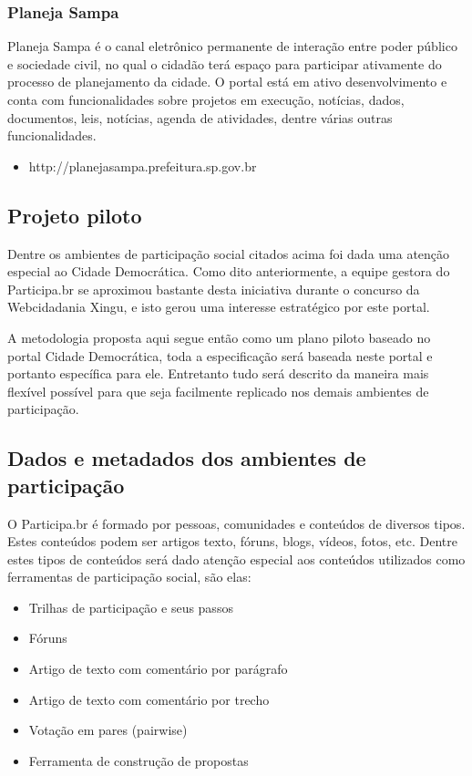 \documentclass[12pt]{article}
\begin{document}
\subsubsection{Planeja Sampa}

Planeja Sampa é o canal eletrônico permanente de interação entre poder público
e sociedade civil, no qual o cidadão terá espaço para participar ativamente do
processo de planejamento da cidade. O portal está em ativo desenvolvimento e
conta com funcionalidades sobre projetos em execução, notícias, dados,
documentos, leis, notícias, agenda de atividades, dentre várias outras
funcionalidades.

\begin{itemize}
  \item http://planejasampa.prefeitura.sp.gov.br
\end{itemize}

\subsection{Projeto piloto}

Dentre os ambientes de participação social citados acima foi dada uma atenção
especial ao Cidade Democrática. Como dito anteriormente, a equipe gestora do
Participa.br se aproximou bastante desta iniciativa durante o concurso da
Webcidadania Xingu, e isto gerou uma interesse estratégico por este portal.

A metodologia proposta aqui segue então como um plano piloto baseado no portal
Cidade Democrática, toda a especificação será baseada neste portal e portanto
específica para ele. Entretanto tudo será descrito da maneira mais flexível
possível para que seja facilmente replicado nos demais ambientes de
participação.

\subsection{Dados e metadados dos ambientes de participação}

O Participa.br é formado por pessoas, comunidades e conteúdos de diversos
tipos. Estes conteúdos podem ser artigos texto, fóruns, blogs, vídeos, fotos,
etc. Dentre estes tipos de conteúdos será dado atenção especial aos conteúdos
utilizados como ferramentas de participação social, são elas:

\begin{itemize}
  \item Trilhas de participação e seus passos
  \item Fóruns
  \item Artigo de texto com comentário por parágrafo
  \item Artigo de texto com comentário por trecho
  \item Votação em pares (pairwise)
  \item Ferramenta de construção de propostas
\end{itemize}
\end{document}
